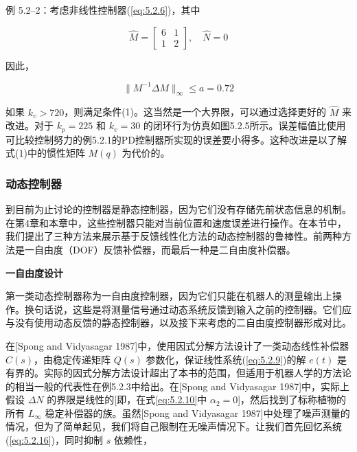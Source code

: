 \documentclass[UTF8,12pt,a4paper]{ctexart}
\begin{document}
\begin{example}
例 5.2--2：考虑非线性控制器(\ref{eq:5.2.6})，其中

\begin{equation}
\hat{M} = \begin{bmatrix} 6 & 1 \\ 1 & 2 \end{bmatrix}, \quad \hat{N} = 0
\end{equation}

因此，

\begin{equation}
\|M^{-1}\Delta M\|_\infty \leq a = 0.72
\end{equation}

如果 $k_v > 720$，则满足条件(1)。这当然是一个大界限，可以通过选择更好的 $\hat{M}$ 来改进。对于 $k_p = 225$ 和 $k_v = 30$ 的闭环行为仿真如图5.2.5所示。误差幅值比使用可比较控制努力的例5.2.1的PD控制器所实现的误差要小得多。这种改进是以了解式(1)中的惯性矩阵 $M(q)$ 为代价的。
\end{example}

\subsubsection{动态控制器}

到目前为止讨论的控制器是静态控制器，因为它们没有存储先前状态信息的机制。在第4章和本章中，这些控制器只能对当前位置和速度误差进行操作。在本节中，我们提出了三种方法来展示基于反馈线性化方法的动态控制器的鲁棒性。前两种方法是一自由度（DOF）反馈补偿器，而最后一种是二自由度补偿器。

\textbf{一自由度设计}

第一类动态控制器称为一自由度控制器，因为它们只能在机器人的测量输出上操作。换句话说，这些是将测量信号通过动态系统反馈到输入之前的控制器。它们应与没有使用动态反馈的静态控制器，以及接下来考虑的二自由度控制器形成对比。

在[Spong and Vidyasagar 1987]中，使用因式分解方法设计了一类动态线性补偿器 $C(s)$，由稳定传递矩阵 $Q(s)$ 参数化，保证线性系统(\ref{eq:5.2.9})的解 $e(t)$ 是有界的。实际的因式分解方法设计超出了本书的范围，但适用于机器人学的方法论的相当一般的代表性在例5.2.3中给出。在[Spong and Vidyasagar 1987]中，实际上假设 $\Delta N$ 的界限是线性的[即，在式\ref{eq:5.2.10}中 $\alpha_2 = 0$]，然后找到了标称植物的所有 $L_\infty$ 稳定补偿器的族。虽然[Spong and Vidyasagar 1987]中处理了噪声测量的情况，但为了简单起见，我们将自己限制在无噪声情况下。让我们首先回忆系统(\ref{eq:5.2.16})，同时抑制 $s$ 依赖性，
\end{document}
